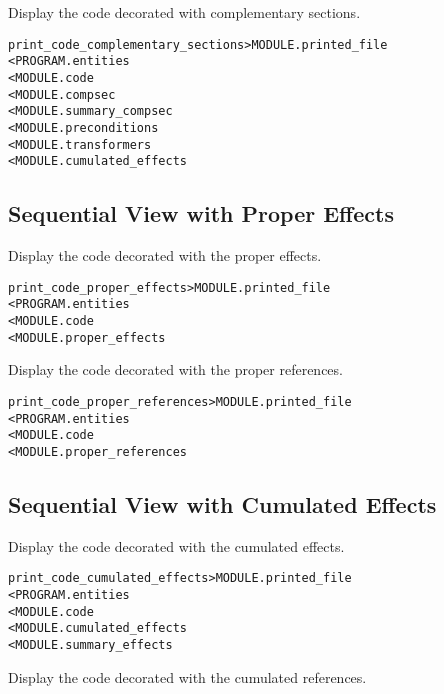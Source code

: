 \documentclass[a4paper]{report}
\newenvironment{PipsMake}{\begin{alltt}}{\end{alltt}}
\begin{document}
Display the code decorated with complementary sections.

\begin{PipsMake}
print_code_complementary_sections > MODULE.printed_file
        < PROGRAM.entities
        < MODULE.code
        < MODULE.compsec
        < MODULE.summary_compsec
        < MODULE.preconditions
        < MODULE.transformers
        < MODULE.cumulated_effects
\end{PipsMake}

\subsection{Sequential View with Proper Effects}

Display the code decorated with the proper effects.

\begin{PipsMake}
print_code_proper_effects       > MODULE.printed_file
        < PROGRAM.entities
        < MODULE.code
        < MODULE.proper_effects
\end{PipsMake}

Display the code decorated with the proper references.

\begin{PipsMake}
print_code_proper_references       > MODULE.printed_file
        < PROGRAM.entities
        < MODULE.code
        < MODULE.proper_references
\end{PipsMake}

\subsection{Sequential View with Cumulated Effects}

Display the code decorated with the cumulated effects.

\begin{PipsMake}
print_code_cumulated_effects    > MODULE.printed_file
        < PROGRAM.entities
        < MODULE.code
        < MODULE.cumulated_effects
        < MODULE.summary_effects
\end{PipsMake}

Display the code decorated with the cumulated references.
\end{document}
